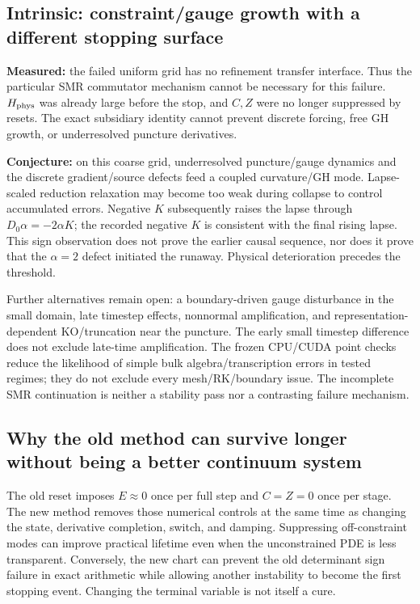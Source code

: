 \documentclass[11pt,letterpaper]{article}
\newcommand{\D}{D_0}\newcommand{\TF}{\operatorname{TF}}\newcommand{\tr}{\operatorname{tr}}
\begin{document}
\subsection{Intrinsic: constraint/gauge growth with a different stopping surface}
\textbf{Measured:} the failed uniform grid has no refinement transfer interface. Thus the particular SMR commutator mechanism cannot be necessary for this failure. $H_{\rm phys}$ was already large before the stop, and $C,Z$ were no longer suppressed by resets. The exact subsidiary identity cannot prevent discrete forcing, free GH growth, or underresolved puncture derivatives.

\textbf{Conjecture:} on this coarse grid, underresolved puncture/gauge dynamics and the discrete gradient/source defects feed a coupled curvature/GH mode. Lapse-scaled reduction relaxation may become too weak during collapse to control accumulated errors. Negative $K$ subsequently raises the lapse through $\D\alpha=-2\alpha K$; the recorded negative $K$ is consistent with the final rising lapse. This sign observation does not prove the earlier causal sequence, nor does it prove that the $\alpha=2$ defect initiated the runaway. Physical deterioration precedes the threshold.

Further alternatives remain open: a boundary-driven gauge disturbance in the small domain, late timestep effects, nonnormal amplification, and representation-dependent KO/truncation near the puncture. The early small timestep difference does not exclude late-time amplification. The frozen CPU/CUDA point checks reduce the likelihood of simple bulk algebra/transcription errors in tested regimes; they do not exclude every mesh/RK/boundary issue. The incomplete SMR continuation is neither a stability pass nor a contrasting failure mechanism.

\subsection{Why the old method can survive longer without being a better continuum system}
The old reset imposes $E\approx0$ once per full step and $C=Z=0$ once per stage. The new method removes those numerical controls at the same time as changing the state, derivative completion, switch, and damping. Suppressing off-constraint modes can improve practical lifetime even when the unconstrained PDE is less transparent. Conversely, the new chart can prevent the old determinant sign failure in exact arithmetic while allowing another instability to become the first stopping event. Changing the terminal variable is not itself a cure.
\end{document}
